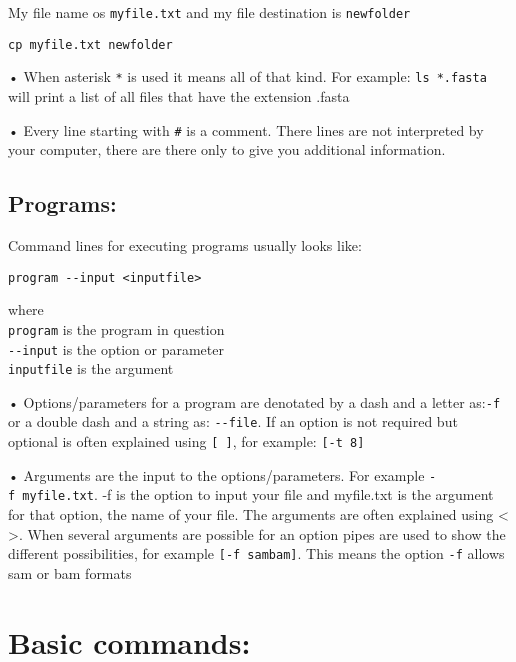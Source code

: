 \documentclass[
]{book}
\begin{document}
My file name os \texttt{myfile.txt} and my file destination is \texttt{newfolder}

\begin{verbatim}
cp myfile.txt newfolder
\end{verbatim}

• When asterisk \texttt{*} is used it means all of that kind. For example: \texttt{ls\ *.fasta} will print a list of all files that have the extension .fasta

• Every line starting with \texttt{\#} is a comment. There lines are not interpreted by your computer, there are there only to give you additional information.

\hypertarget{programs}{%
\subsection{Programs:}\label{programs}}

Command lines for executing programs usually looks like:

\begin{verbatim}
program --input <inputfile>
\end{verbatim}

where\\
\texttt{program} is the program in question\\
\texttt{-\/-input} is the option or parameter\\
\texttt{inputfile} is the argument

• Options/parameters for a program are denotated by a dash and a letter as:\texttt{-f} or a double dash and a string as: \texttt{-\/-file}. If an option is not required but optional is often explained using \texttt{{[}\ {]}}, for example: \texttt{{[}-t\ 8{]}}

• Arguments are the input to the options/parameters. For example \texttt{-f\ myfile.txt}. -f is the option to input your file and myfile.txt is the argument for that option, the name of your file. The arguments are often explained using \textless{} \textgreater. When several arguments are possible for an option pipes are used to show the different possibilities, for example \texttt{{[}-f\ sam\textbar{}bam{]}}. This means the option \texttt{-f} allows sam or bam formats

\hypertarget{basic-commands}{%
\section{Basic commands:}\label{basic-commands}}
\end{document}
